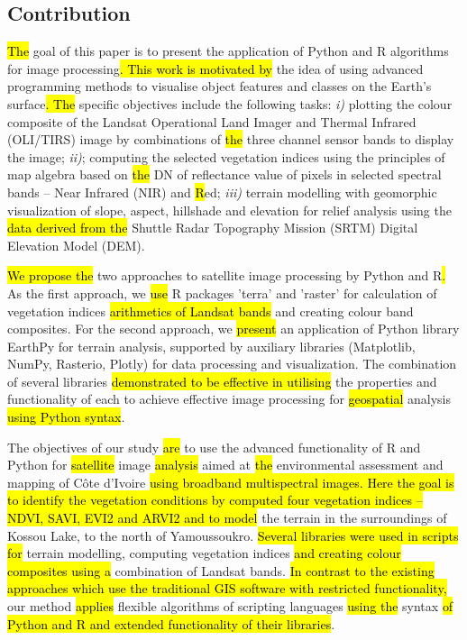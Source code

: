 \documentclass[jimaging,article,submit,pdftex,moreauthors]{Definitions/mdpi}
\begin{document}
\subsection{Contribution}

\hl{The }goal of this paper is to present the application of Python and R algorithms for image processing\hl{. This work is motivated by }the idea of using\hl{ }advanced programming methods\hl{ }to visualise\hl{ }object features and classes on the Earth's surface\hl{. The }specific objectives include the following tasks: \emph{i)} plotting the colour composite of the Landsat Operational Land Imager and Thermal Infrared (OLI/TIRS) image by\hl{ } combinations of \hl{the} three channel sensor bands to display the image; \emph{ii)}; computing the selected vegetation indices using the principles of map algebra based on \hl{the} DN of reflectance value of pixels in selected spectral bands -- Near Infrared (NIR) and \hl{R}ed; \emph{iii)} terrain modelling with geomorphic visualization of slope, aspect, hillshade and elevation for relief analysis using the \hl{data derived from the }Shuttle Radar Topography Mission (SRTM) Digital Elevation Model (DEM). 

\hl{We propose the} two approaches\hl{ }to\hl{ }satellite image processing by\hl{ }Python and R\hl{. }As the first approach, we \hl{use }R packages 'terra' and 'raster' for calculation of vegetation indices \hl{arithmetics of Landsat bands} and creating colour band composites. For the second approach, we \hl{present} an application of Python library EarthPy for terrain analysis, supported by auxiliary libraries (Matplotlib, NumPy, Rasterio, Plotly) for data processing and visualization. The combination of several libraries \hl{demonstrated to be effective in utilising} the properties and functionality of each to achieve effective image processing for \hl{geospatial} analysis \hl{using Python syntax}.

The objectives of our study \hl{are} to use the advanced functionality of\hl{ }R and Python for \hl{satellite} image \hl{analysis }aimed at \hl{the} environmental assessment and mapping of C\^ote d'Ivoire\hl{ using broadband multispectral images. Here the goal is to identify the vegetation conditions by computed four vegetation indices  -- NDVI, SAVI, EVI2 and ARVI2 and to model} the terrain in the surroundings of Kossou Lake, to the north of Yamoussoukro. \hl{Several libraries were used in scripts for }terrain modelling, computing vegetation indices \hl{and creating colour composites using a} combination of Landsat bands. \hl{In contrast to the existing approaches which use the traditional GIS software with restricted functionality,} our method \hl{applies} flexible algorithms of scripting languages \hl{using the} syntax \hl{of Python and R and extended functionality of their libraries}. 
\end{document}
